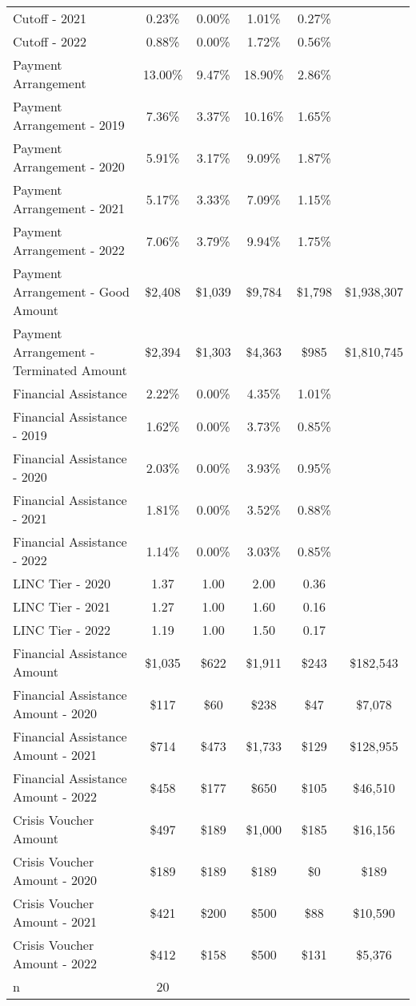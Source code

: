 \begin{tabular}{l|c|c|c|c|c}
\quad Cutoff - 2021 & 0.23\% & 0.00\% & 1.01\% & 0.27\% \\
\quad Cutoff - 2022 & 0.88\% & 0.00\% & 1.72\% & 0.56\% \\
\midrule 
Payment Arrangement & 13.00\% & 9.47\% & 18.90\% & 2.86\% \\
\quad Payment Arrangement - 2019 & 7.36\% & 3.37\% & 10.16\% & 1.65\% \\
\quad Payment Arrangement - 2020 & 5.91\% & 3.17\% & 9.09\% & 1.87\% \\
\quad Payment Arrangement - 2021 & 5.17\% & 3.33\% & 7.09\% & 1.15\% \\
\quad Payment Arrangement - 2022 & 7.06\% & 3.79\% & 9.94\% & 1.75\% \\
\quad Payment Arrangement - Good Amount & \$2,408 & \$1,039 & \$9,784 & \$1,798 & \$1,938,307 \\
\quad Payment Arrangement - Terminated Amount & \$2,394 & \$1,303 & \$4,363 & \$985 & \$1,810,745 \\
\midrule 
Financial Assistance & 2.22\% & 0.00\% & 4.35\% & 1.01\% \\
\quad Financial Assistance - 2019 & 1.62\% & 0.00\% & 3.73\% & 0.85\% \\
\quad Financial Assistance - 2020 & 2.03\% & 0.00\% & 3.93\% & 0.95\% \\
\quad Financial Assistance - 2021 & 1.81\% & 0.00\% & 3.52\% & 0.88\% \\
\quad Financial Assistance - 2022 & 1.14\% & 0.00\% & 3.03\% & 0.85\% \\
\midrule 
LINC Tier - 2020 & 1.37 & 1.00 & 2.00 & 0.36 \\
LINC Tier - 2021 & 1.27 & 1.00 & 1.60 & 0.16 \\
LINC Tier - 2022 & 1.19 & 1.00 & 1.50 & 0.17 \\
\midrule 
Financial Assistance Amount & \$1,035 & \$622 & \$1,911 & \$243 & \$182,543 \\
\quad Financial Assistance Amount - 2020 & \$117 & \$60 & \$238 & \$47 & \$7,078 \\
\quad Financial Assistance Amount - 2021 & \$714 & \$473 & \$1,733 & \$129 & \$128,955 \\
\quad Financial Assistance Amount - 2022 & \$458 & \$177 & \$650 & \$105 & \$46,510 \\
\midrule 
Crisis Voucher Amount & \$497 & \$189 & \$1,000 & \$185 & \$16,156 \\
\quad Crisis Voucher Amount - 2020 & \$189 & \$189 & \$189 & \$0 & \$189 \\
\quad Crisis Voucher Amount - 2021 & \$421 & \$200 & \$500 & \$88 & \$10,590 \\
\quad Crisis Voucher Amount - 2022 & \$412 & \$158 & \$500 & \$131 & \$5,376 \\
\midrule 
n & 20 &  &  &  &  \\
\midrule 
\bottomrule 
\end{tabular}
